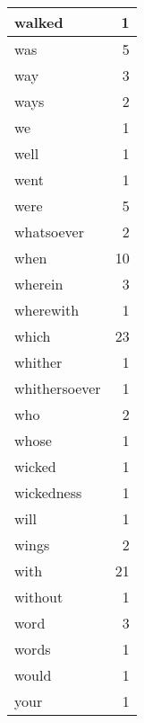\begin{center}
\begin{longtable}{l|r}
walked & 1 \\ \hline
was & 5 \\ \hline
way & 3 \\ \hline
ways & 2 \\ \hline
we & 1 \\ \hline
well & 1 \\ \hline
went & 1 \\ \hline
were & 5 \\ \hline
whatsoever & 2 \\ \hline
when & 10 \\ \hline
wherein & 3 \\ \hline
wherewith & 1 \\ \hline
which & 23 \\ \hline
whither & 1 \\ \hline
whithersoever & 1 \\ \hline
who & 2 \\ \hline
whose & 1 \\ \hline
wicked & 1 \\ \hline
wickedness & 1 \\ \hline
will & 1 \\ \hline
wings & 2 \\ \hline
with & 21 \\ \hline
without & 1 \\ \hline
word & 3 \\ \hline
words & 1 \\ \hline
would & 1 \\ \hline
your & 1 \\ \hline
\end{longtable}
\end{center}



\normalsize



